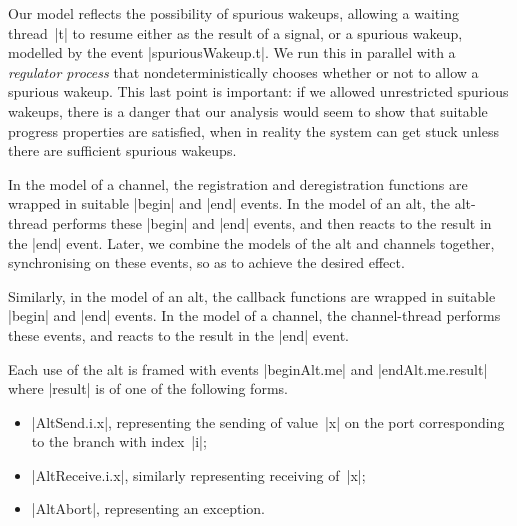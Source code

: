 Our model reflects the possibility of spurious wakeups, allowing a waiting
thread~|t| to resume either as the result of a signal, or a spurious wakeup,
modelled by the event |spuriousWakeup.t|.  We run this in parallel with a
\emph{regulator process} that nondeterministically chooses whether or not to
allow a spurious wakeup.  This last point is important: if we allowed
unrestricted spurious wakeups, there is a danger that our analysis would seem
to show that suitable progress properties are satisfied, when in reality the
system can get stuck unless there are sufficient spurious wakeups.

In the model of a channel, the registration and deregistration functions are
wrapped in suitable |begin| and |end| events.  In the model of an alt, the
alt-thread performs these |begin| and |end| events, and then reacts to the
result in the |end| event.  Later, we combine the models of the alt and
channels together, synchronising on these events, so as to achieve the desired
effect.

Similarly, in the model of an alt, the callback functions are wrapped in
suitable |begin| and |end| events.  In the model of a channel, the
channel-thread performs these events, and reacts to the result in the |end|
event.  

Each use of the alt is framed with events |beginAlt.me| and |endAlt.me.result|
where |result| is of one of the following forms.
%
\begin{itemize}
\item |AltSend.i.x|, representing the sending of value~|x| on the port
  corresponding to the branch with index~|i|;

\item |AltReceive.i.x|, similarly representing receiving of~|x|;

\item |AltAbort|, representing an  exception.
\end{itemize}
